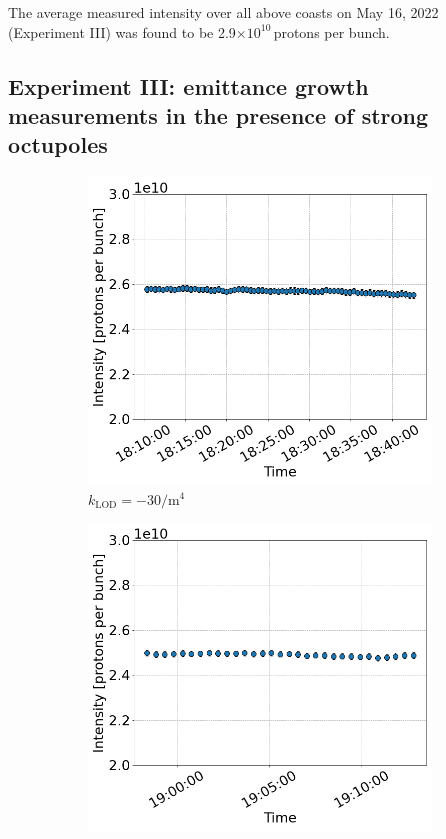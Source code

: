  The average measured intensity over all above coasts on May 16, 2022 (Experiment III) was found to be 2.9$\times 10^{10}$\,protons per bunch. 
 

 \subsection{Experiment III: emittance growth measurements in the presence of strong octupoles}\label{subsec:2022_exp3_intensity}

 \begin{figure}[htp]
    \centering
    \begin{subfigure}{.45\textwidth}
        \centering
        \includegraphics[width=.95\linewidth]{images/app_e/intensity_cc_md_12Sep22_coast_6.png}  
        \caption{$k_\mathrm{LOD}=-30 \mathrm{/m^{4}}$}
    \end{subfigure}
    \begin{subfigure}{.45\textwidth}
        \centering
        \includegraphics[width=.95\linewidth]{images/app_e/intensity_cc_md_12Sep22_coast_7.png}  

\end{subfigure}
\end{figure}
